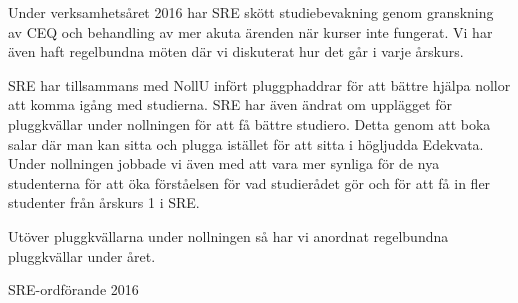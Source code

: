 \documentclass[../_main/handlingar.tex]{subfiles}
\begin{document}
Under verksamhetsåret 2016 har SRE skött studiebevakning genom granskning av CEQ och behandling av mer akuta ärenden när kurser inte fungerat. Vi har även haft regelbundna möten där vi diskuterat hur det går i varje årskurs.

SRE har tillsammans med NollU infört pluggphaddrar för att bättre hjälpa nollor att komma igång med studierna. SRE har även ändrat om upplägget för pluggkvällar under nollningen för att få bättre studiero. Detta genom att boka salar där man kan sitta och plugga istället för att sitta i högljudda Edekvata. Under nollningen jobbade vi även med att vara mer synliga för de nya studenterna för att öka förståelsen för vad studierådet gör och för att få in fler studenter från årskurs 1 i SRE.

Utöver pluggkvällarna under nollningen så har vi anordnat regelbundna pluggkvällar under året.
\begin{signatures}{1}
    \mvh
    \signature{Johan Persson}{SRE-ordförande 2016}
\end{signatures}
\end{document}
